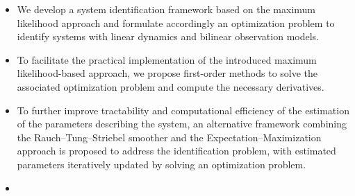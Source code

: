 \begin{itemize}
    \item 
    We develop a system identification framework based on the maximum likelihood approach and formulate accordingly an optimization problem to identify systems with linear dynamics and bilinear observation models.
    \item  
    To facilitate the practical implementation of the introduced maximum likelihood-based approach, we propose first-order methods to solve the associated optimization problem and compute the necessary derivatives.
    \item 
    To further improve tractability and computational efficiency of the estimation of the parameters describing the system, an alternative framework combining the Rauch–Tung–Striebel smoother and the Expectation--Maximization approach is proposed to address the identification problem, with estimated parameters iteratively updated by solving an optimization problem.
    \item 

\end{itemize}

